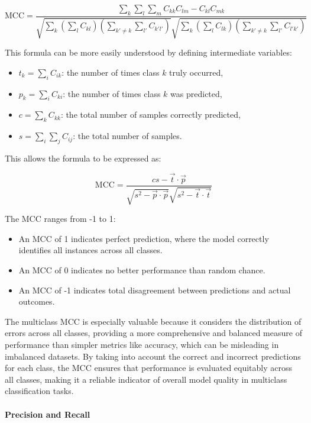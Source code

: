 \[
    \text{MCC} = \frac{\sum_k \sum_l \sum_m C_{kk} C_{lm} - C_{kl} C_{mk}}{\sqrt{\sum_k \left( \sum_l C_{kl} \right) \left( \sum_{k' \ne k} \sum_{l'} C_{k'l'} \right)} \sqrt{\sum_k \left( \sum_l C_{lk} \right) \left( \sum_{k' \ne k} \sum_{l'} C_{l'k'} \right)}}
\]


This formula can be more easily understood by defining intermediate variables:

\begin{itemize}
    \item $t_k = \sum_i C_{ik}$: the number of times class $k$ truly occurred,
    \item $p_k = \sum_i C_{ki}$: the number of times class $k$ was predicted,
    \item $c = \sum_k C_{kk}$: the total number of samples correctly predicted,
    \item $s = \sum_i \sum_j C_{ij}$: the total number of samples.
\end{itemize}
\noindent
This allows the formula to be expressed as:

\[
    \text{MCC} = \frac{cs - \vec{t} \cdot \vec{p}}{\sqrt{s^2 - \vec{p} \cdot \vec{p}} \sqrt{s^2 - \vec{t} \cdot \vec{t}}}
\]

\noindent
The MCC ranges from -1 to 1:
\begin{itemize}
    \item An MCC of 1 indicates perfect prediction, where the model correctly identifies all instances across all classes.
    \item An MCC of 0 indicates no better performance than random chance.
    \item An MCC of -1 indicates total disagreement between predictions and actual outcomes.
\end{itemize}
\noindent
The multiclass MCC is especially valuable because it considers the distribution of errors across all classes, providing a more comprehensive
and balanced measure of performance than simpler metrics like accuracy, which can be misleading in imbalanced datasets.
By taking into account the correct and incorrect predictions for each class, the MCC ensures that performance is evaluated equitably across all classes,
making it a reliable indicator of overall model quality in multiclass classification tasks.

\paragraph{Precision and Recall}

